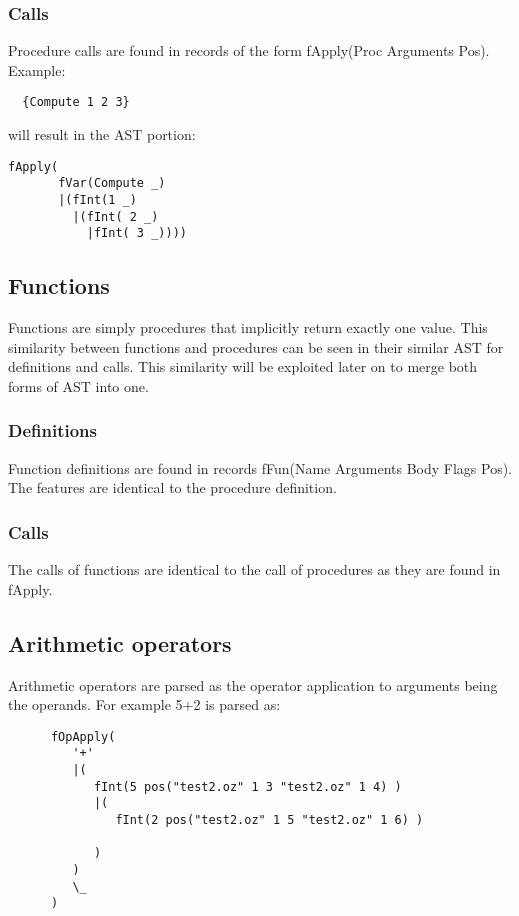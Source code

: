 \documentclass[a4paper]{memoir}
\begin{document}
\subsubsection{Calls}
Procedure calls are found in records of the form fApply(Proc Arguments Pos). 
Example:

\begin{lstlisting}
  {Compute 1 2 3}
\end{lstlisting}

will result in the AST portion:
\begin{verbatim}
fApply(
       fVar(Compute _)
       |(fInt(1 _)
         |(fInt( 2 _)
           |fInt( 3 _))))
\end{verbatim}

\subsection{Functions}                                                         
Functions are simply procedures that implicitly return exactly one value. This similarity between functions and procedures can be seen in their similar AST for definitions and calls. This similarity will be exploited later on to merge both forms of AST into one.
\subsubsection{Definitions}
Function definitions are found in records fFun(Name Arguments Body Flags Pos). The features are identical to the procedure definition.
\subsubsection{Calls}
The calls of functions are identical to the call of procedures as they are found in fApply.
\subsection{Arithmetic operators}
Arithmetic operators are parsed as the operator application to arguments being the operands. For example
5+2 is parsed as:
\begin{lstlisting}
      fOpApply(
         '+'
         |(
            fInt(5 pos("test2.oz" 1 3 "test2.oz" 1 4) )
            |(
               fInt(2 pos("test2.oz" 1 5 "test2.oz" 1 6) )
               
            )
         )
         \_
      )

\end{lstlisting}
\end{document}
